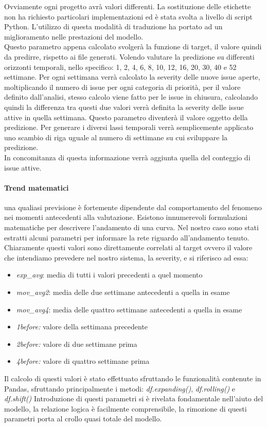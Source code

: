\documentclass[%
    corpo=12pt,
    twoside,
    oldstyle,
    autoretitolo,
    greek,
    evenboxes,
]{toptesi}
\begin{document}
Ovviamente ogni progetto avrà valori differenti. La sostituzione delle etichette non ha richiesto particolari implementazioni ed è stata svolta a livello di script Python. L'utilizzo di questa modalità di traduzione ha portato ad un miglioramento nelle prestazioni del modello.\\
Questo parametro appena calcolato svolgerà la funzione di target, il valore quindi da predirre, rispetto ai file generati. Volendo valutare la predizione su differenti orizzonti temporali, nello specifico: 1, 2, 4, 6, 8, 10, 12, 16, 20, 30, 40 e 52 settimane. Per ogni settimana verrà calcolato la severity delle nuove issue aperte, moltiplicando il numero di issue per ogni categoria di priorità, per il valore definito dall'analisi, stesso calcolo viene fatto per le issue in chiusura, calcolando quindi la differenza tra questi due valori verrà definita la severity delle issue attive in quella settimana. Questo parametro diventerà il valore oggetto della predizione. Per generare i diversi lassi temporali verrà semplicemente applicato uno scambio di riga uguale al numero di settimane su cui sviluppare la predizione.\\
In concomitanza di questa informazione verrà aggiunta quella del conteggio di issue attive.


\paragraph{Trend matematici} una qualiasi previsione è fortemente dipendente dal comportamento del fenomeno nei momenti antecedenti alla valutazione. Esistono innumerevoli formulazioni matematiche per descrivere l'andamento di una curva. Nel nostro caso sono stati estratti alcuni parametri per informare la rete riguardo all'andamento tenuto. Chiaramente questi valori sono direttamente correlati al target ovvero il valore che intendiamo prevedere nel nostro sistema, la severity, e si riferisco ad essa:
\begin{itemize}
  \item \textit{exp\_avg}: media di tutti i valori precedenti a quel momento
  \item \textit{mov\_avg2}: media delle due settimane antecedenti a quella in esame
  \item \textit{mov\_avg4}: media delle quattro settimane antecedenti a quella in esame
  \item \textit{1before:} valore della settimana precedente
  \item \textit{2before:} valore di due settimane prima
  \item \textit{4before:} valore di quattro settimane prima
\end{itemize}
Il calcolo di questi valori è stato effettuato sfruttando le funzionalità contenute in Pandas, sfruttando principalmente i metodi: \textit{df.expanding()}, \textit{df.rolling()} e \textit{df.shift()}
Introduzione di questi parametri si è rivelata fondamentale nell'aiuto del modello, la relazione logica è facilmente comprensibile, la rimozione di questi parametri porta al crollo quasi totale del modello.
\end{document}
